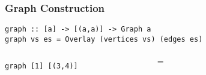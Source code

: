 \documentclass{beamer}
\newcommand{\hs}{\texttt}
\begin{document}
\begin{frame}[fragile]
  \frametitle{Graph Construction}
  \onslide<+->
  \begin{verbatim}
graph :: [a] -> [(a,a)] -> Graph a
graph vs es = Overlay (vertices vs) (edges es)
  \end{verbatim}
  \onslide<+->
  \vspace{5mm}
  \begin{columns}
    \begin{column}{.3\textwidth}
      \hs{graph [1] [(3,4)]}
    \end{column}
    \begin{column}{.05\textwidth}
      {\LARGE $=$}
    \end{column}
    \begin{column}{.4\textwidth}
    \end{column}
  \end{columns}
\end{frame}
\end{document}
